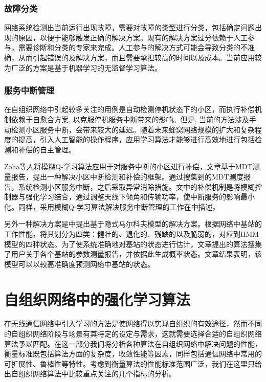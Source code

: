 \documentclass{IEEEtran}
\begin{document}
\subsubsection{故障分类}

网络系统检测出当前运行出现故障，需要对故障的类型进行分类，包括确定问题出现的原因，以便于能够触发正确的解决方案。现有的解决方案过分依赖于人工参与，需要诊断和分类的专家来完成。人工参与的解决方式可能会导致分类的不准确，从而引起错误的及解决方案，而且需要承担较高的时间以及成本。当前应用较为广泛的方案是基于机器学习的无监督学习算法。


\subsubsection{服务中断管理}

在自组织网络中引起较多关注的用例是自动检测停机状态下的小区，而执行补偿机制依赖于自愈合方案, 以克服停机服务中断带来的影响。但是, 当前的方法涉及手动检测小区服务中断，会带来较大的延迟。随着未来蜂窝网络规模的扩大和复杂程度的提高，引入人工智能的操作程序，应用学习算法才能够进行高效地进行包括检测和补偿的自主管理。

Zoha等人\cite{Zoha2016}将模糊Q-学习算法应用于对服务中断的小区进行补偿，文章基于MDT测量报告，提出一种解决小区中断检测和补偿的框架。通过搜集到的MDT测度报告，系统检测小区服务中断，之后采取异常消除措施。文中的补偿机制是将模糊控制器与强化学习结合，通过调整天线下倾角和传输功率，使中断服务的影响最小化。同样，采用模糊Q-学习算法解决服务中断管理的工作在\cite{Razavi2010}\cite{Razavi2010a}\cite{Islam2012}中描述。

另外一种解决方案是\cite{Alias2016}中提出基于隐式马尔科夫模型的解决方案。根据网络中基站的工作性能，将其划分为四类：健壮的、退化的、残缺的以及脆弱的，对应到HMM模型的四种状态。为了使系统准确地对基站的状态进行估计，文章提出的算法搜集了用户关于各个基站的参数测量报告，并依据此生成概率状态。文章结果表明，该模型可以以较高准确度预测网络中基站的状态。

\section{自组织网络中的强化学习算法}
\label{sec:Compare}
在无线通信网络中引入学习的方法是使网络得以实现自组织的有效途径，然而不同的自组织网络阶段与场景有其特定的设定与需求，这就需要选择合适的自组织网络算法予以匹配。在这一部分我们将分析各种算法在自组织网络中解决问题的性能，衡量标准既包括算法方面的复杂度，收敛性能等因素，同样包括通信网络中常用的可扩展性、鲁棒性等特性。考虑到衡量算法的性能标准范围广泛，我们在这里只给出自组织网络算法中比较重点关注的几个指标的分析。
\end{document}

